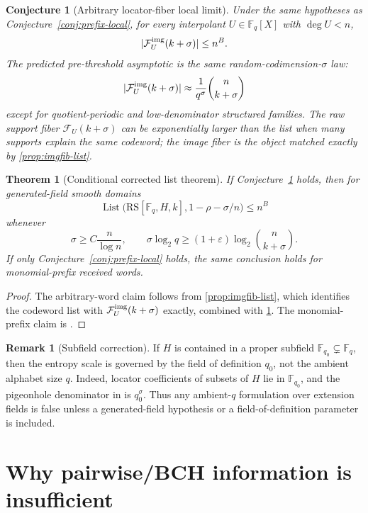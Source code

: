 \documentclass[11pt]{article}
\newtheorem{theorem}{Theorem}[section]
\newtheorem{conjecture}[conjecture]{Conjecture}
\theoremstyle{definition}
\newtheorem{remark}[remark]{Remark}
\newcommand{\F}{\mathbb F}
\newcommand{\eps}{\varepsilon}
\newcommand{\RS}{\mathrm{RS}}
\newcommand{\Lst}{\operatorname{List}}
\newcommand{\Fib}{\mathcal F}
\newcommand{\ImgFib}{\mathcal F^{\rm img}}
\begin{document}
\begin{conjecture}[Arbitrary locator-fiber local limit]\label{conj:arbitrary-local}
Under the same hypotheses as Conjecture~\ref{conj:prefix-local}, for every interpolant $U\in\F_q[X]$ with $\deg U<n$,
\[
        |\ImgFib_U(k+\sigma)|\le n^B.
\]
The predicted pre-threshold asymptotic is the same random-codimension-$\sigma$ law:
\[
        |\ImgFib_U(k+\sigma)|
        \approx \frac1{q^\sigma}\binom n{k+\sigma}
\]
except for quotient-periodic and low-denominator structured families.  The raw
support fiber $\Fib_U(k+\sigma)$ can be exponentially larger than the list when
many supports explain the same codeword; the image fiber is the object matched
exactly by \cref{prop:imgfib-list}.
\end{conjecture}

\begin{theorem}[Conditional corrected list theorem]\label{thm:conditional-list}
If Conjecture~\ref{conj:arbitrary-local} holds, then for generated-field smooth domains
\[
        \Lst\big(\RS[\F_q,H,k],1-\rho-\sigma/n\big)\le n^B
\]
whenever
\[
        \sigma\ge C\frac n{\log n},
        \qquad
        \sigma\log_2q\ge(1+\eps)\log_2\binom n{k+\sigma}.
\]
If only Conjecture~\ref{conj:prefix-local} holds, the same conclusion holds for monomial-prefix received words.
\end{theorem}

\begin{proof}
The arbitrary-word claim follows from \cref{prop:imgfib-list}, which identifies
the codeword list with $\ImgFib_U(k+\sigma)$ exactly, combined with
\cref{conj:arbitrary-local}.  The monomial-prefix claim is
.
\end{proof}

\begin{remark}[Subfield correction]\label{rem:subfield}
If $H$ is contained in a proper subfield $\F_{q_0}\subsetneq\F_q$, then the entropy scale is governed by the field of definition $q_0$, not the ambient alphabet size $q$.  Indeed, locator coefficients of subsets of $H$ lie in $\F_{q_0}$, and the pigeonhole denominator in  is $q_0^\sigma$.  Thus any ambient-$q$ formulation over extension fields is false unless a generated-field hypothesis or a field-of-definition parameter is included.
\end{remark}

\section{Why pairwise/BCH information is insufficient}\label{sec:pairwise}
\end{document}
